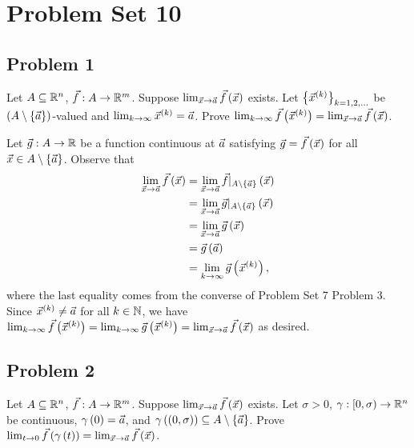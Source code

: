 \documentclass[main.tex]{subfiles}
\begin{document}
\section{Problem Set 10}
\subsection{Problem 1}
\begin{claim}
    Let $A \subseteq \mathbb R^n$, $\vec{f} : A \to \mathbb R^m$. Suppose $\lim_{\vec{x}\to \vec{a}} \vec{f}\left( \vec{x} \right)$ exists. Let $\left\{ \vec{x}^{(k)} \right\}_{k = 1, 2, \ldots}$ be $\left( A\setminus \left\{ \vec{a} \right\} \right)$-valued and $\lim_{k\to \infty} \vec{x}^{(k)} = \vec{a}$. Prove $\lim_{k\to \infty} \vec{f}\left( \vec{x}^{(k)} \right) = \lim_{\vec{x}\to \vec{a}} \vec{f}\left( \vec{x} \right)$.
\end{claim}

\begin{soln}
    Let $\vec{g} : A \to \mathbb R$ be a function continuous at $\vec{a}$ satisfying $\vec{g} =     \vec{f}\left( \vec{x} \right)$ for all $\vec{x} \in A \setminus \left\{ \vec{a} \right\}$. Observe that
    \begin{align*}
        \lim_{\vec{x}\to \vec{a}} \vec{f}\left( \vec{x} \right) &= \lim_{\vec{x}\to \vec{a}} \vec{f}|_{A\setminus\left\{ \vec{a} \right\}} \left( \vec{x} \right) \\
        &= \lim_{\vec{x}\to \vec{a}} \vec{g}|_{A\setminus\left\{ \vec{a} \right\}} \left( \vec{x} \right) \\
        &= \lim_{\vec{x}\to \vec{a}} \vec{g}\left( \vec{x} \right) \\
        &= \vec{g}\left( \vec{a} \right) \\
        &= \lim_{k\to \infty} \vec{g}\left( \vec{x}^{(k)} \right),
    \end{align*}
    where the last equality comes from the converse of Problem Set 7 Problem 3. Since $\vec{x}^{(k)} \neq \vec{a}$ for all $k\in \mathbb N$, we have $\lim_{k\to \infty} \vec{f}\left( \vec{x}^{(k)} \right) = \lim_{k\to \infty} \vec{g}\left( \vec{x}^{(k)} \right) = \lim_{\vec{x}\to \vec{a}}\vec{f}\left( \vec{x} \right)$ as desired.
\end{soln}
\eject

\subsection{Problem 2}
\begin{claim}
    Let $A \subseteq \mathbb R^n$, $\vec{f} : A \to \mathbb R^m$. Suppose $\lim_{\vec{x}\to \vec{a}} \vec{f}\left( \vec{x} \right)$ exists. Let $\sigma > 0$, $\gamma : [0, \sigma)\to \mathbb R^n$ be continuous, $\gamma\left( 0 \right) = \vec{a}$, and $\gamma\left( \left( 0, \sigma \right) \right) \subseteq A\setminus \left\{ \vec{a} \right\}$. Prove $\lim_{t\to 0}\vec{f}\left( \gamma\left( t \right) \right) = \lim_{\vec{x}\to \vec{a}}\vec{f}\left( \vec{x} \right)$.
\end{claim}
\end{document}
